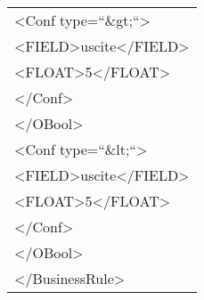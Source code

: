 \begin{center}
\begin{tabular}{|p{11cm}|}
\textless Conf type=``\&gt;``\textgreater \\
\textless FIELD\textgreater uscite\textless /FIELD\textgreater\\
 \textless FLOAT\textgreater 5\textless /FLOAT\textgreater\\
 \textless /Conf\textgreater\\
\textless /OBool\textgreater \\
\textless Conf type=``\&lt;``\textgreater \\
\textless FIELD\textgreater uscite\textless /FIELD\textgreater\\
 \textless FLOAT\textgreater 5\textless /FLOAT\textgreater\\
 \textless /Conf\textgreater\\
\textless /OBool\textgreater \\
\textless /BusinessRule\textgreater \\
 \hline
\end{tabular} \\
\end{center}


